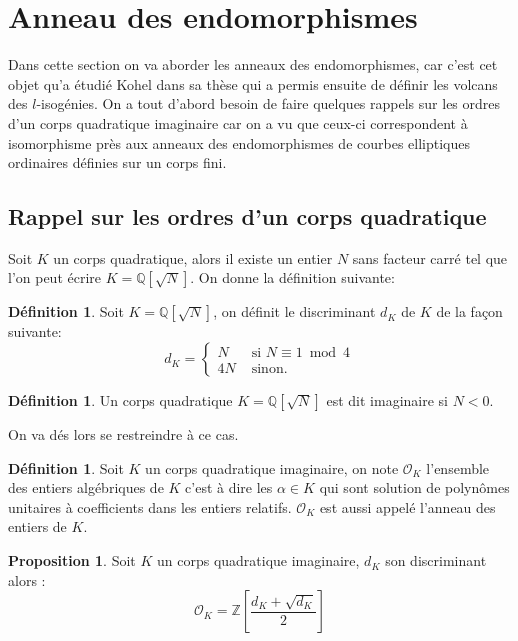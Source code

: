 \documentclass[10pt,a4paper]{book}
\theoremstyle{plain}
\theoremstyle{definition}
\theoremstyle{definition}
\theoremstyle{definition}
\theoremstyle{definition}
\newtheorem{prop}[thm]{Proposition}
\theoremstyle{definition}
\newtheorem{defi}[thm]{Définition}
\theoremstyle{remark}
\theoremstyle{remark}
\theoremstyle{definition}
\begin{document}
\section{Anneau des endomorphismes}
\label{sec:ann:end}
Dans cette section on va aborder les anneaux des endomorphismes, car c'est cet objet qu'a étudié Kohel dans sa thèse \cite{Kohel96} qui a permis ensuite de définir les volcans des $l$-isogénies. On a tout d'abord besoin de faire quelques rappels sur les ordres d'un corps quadratique imaginaire car on a vu que ceux-ci correspondent à isomorphisme près aux anneaux des endomorphismes de courbes elliptiques ordinaires définies sur un corps fini.

\subsection{Rappel sur les ordres d'un corps quadratique}

Soit $K$ un corps quadratique, alors il existe un entier $N$ sans facteur carré tel que l'on peut écrire $K=\mathbb{Q}[\sqrt{N}]$. On donne la définition suivante:
\begin{defi}
\label{def:dis:dK}
Soit $K=\mathbb{Q}[\sqrt{N}]$, on définit le discriminant $d_K$ de $K$ de la façon suivante: 
\begin{equation*}
d_K=\begin{cases}
N & \text{ si }  N \equiv 1 \bmod 4 \\
4N & \text{ sinon.}
\end{cases}
\end{equation*}
\end{defi}

\begin{defi}
Un corps quadratique $K=\mathbb{Q}[\sqrt{N}]$ est dit imaginaire si $N<0$. 
\end{defi}

On va dés lors se restreindre à ce cas.

\begin{defi}
Soit $K$ un corps quadratique imaginaire, on note $\mathcal{O}_K$ l'ensemble 
des entiers algébriques de $K$ c'est à dire les $\alpha \in K$ qui sont 
solution de polynômes unitaires à coefficients dans les entiers relatifs. 
$\mathcal{O}_K$ est aussi appelé l'anneau des entiers de $K$.
\end{defi}

\begin{prop}
Soit $K$ un corps quadratique imaginaire, $d_K$ son discriminant alors : 
\[ \mathcal{O}_K=\mathbb{Z} \left[ \frac{d_K+\sqrt{d_K}}{2} \right]  \]  
\end{prop}
\end{document}
